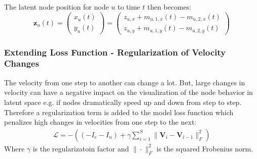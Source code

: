 The latent node position for node $u$ to time $t$ then becomes:
\begin{equation}
    \textbf{z}_{u}(t) = 
    \begin{pmatrix}
        x_{u}(t) \\
        y_{u}(t)
    \end{pmatrix}
    =
    \begin{pmatrix}
        z_{u,x} + m_{u,1,x}(t) - m_{u,2,x}(t) \\
        z_{u,y}+ m_{u,1,y}(t) - m_{u,2,y}(t)
    \end{pmatrix}
\end{equation}


\subsubsection{Extending Loss Function - Regularization of Velocity Changes}
\label{sec:Method:ProposedModel:Regularization}
The velocity from one step to another can change a lot. But, large changes in velocity can have a negative impact on the visualization of the node behavior in latent space e.g. if nodes dramatically speed up and down from step to step.
Therefore a regularization term is added to the model loss function which penalizes high changes in velocities from one step to the next:
\begin{align}
    \mathcal{L} = - \left((- I_e - I_n) + \gamma \sum_{i=1}^{S} \rVert \textbf{V}_i - \textbf{V}_{i-1} \rVert_{F}^{2}\right)
    \label{eq:Method:ProposedModel:vec_regularization}
\end{align}
Where $\gamma$ is the regularizatoin factor and $\rVert \cdot \rVert_F^2$ is the squared Frobenius norm.
